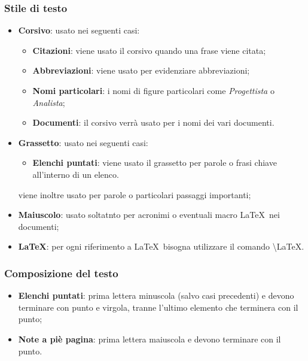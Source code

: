 \documentclass[../NormeDiProgetto.tex]{subfiles}
\begin{document}
		\subsubsection{Stile di testo}
		\begin{itemize}
			\item \textbf{Corsivo}: usato nei seguenti casi:
			\begin{itemize}
				\item \textbf{Citazioni}: viene usato il corsivo quando una frase viene citata;
				\item \textbf{Abbreviazioni}: viene usato per evidenziare abbreviazioni;  
				\item \textbf{Nomi particolari}: i nomi di figure particolari come \textit{Progettista} o \textit{Analista};  
				\item \textbf{Documenti}: il corsivo verrà usato per i nomi dei vari documenti.
			\end{itemize}
			
			\item \textbf{Grassetto}: usato nei seguenti casi:
			\begin{itemize}
				\item \textbf{Elenchi puntati}: viene usato il grassetto per parole o frasi chiave all'interno di un elenco.
				
			\end{itemize}			
			viene inoltre usato per parole o particolari passaggi importanti;
			\item \textbf{Maiuscolo}: usato soltatnto per acronimi o eventuali macro \LaTeX\ nei documenti;
			\item \textbf{\LaTeX }: per ogni riferimento a \LaTeX\ bisogna utilizzare il comando \textbackslash LaTeX.
			
		\end{itemize}
		
		\subsubsection{Composizione del testo}
		\begin{itemize}
			\item \textbf{Elenchi puntati}: prima lettera minuscola (salvo casi precedenti) e devono terminare con punto e virgola, tranne l'ultimo elemento che terminera con il punto;
			\item \textbf{Note a piè pagina}: prima lettera maiuscola e devono terminare con il punto.
		\end{itemize}
\end{document}
